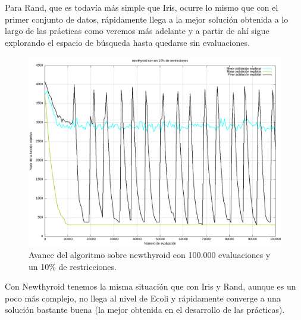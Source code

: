\documentclass[12pt, spanish]{article}
\begin{document}
Para Rand, que es todavía más simple que Iris, ocurre lo mismo que con el primer conjunto de datos, rápidamente llega a la mejor solución obtenida a lo largo de las prácticas como veremos más adelante y a partir de ahí sigue explorando el espacio de búsqueda hasta quedarse sin evaluaciones.

\begin{figure}[H]
	\centering
	\includegraphics[scale = 0.5]{newthyroid_1.png}
	
	\caption{Avance del algoritmo sobre newthyroid con 100.000 evaluaciones y un 10\% de restricciones.}
	\label{fig:new_1}
\end{figure}

Con Newthyroid tenemos la misma situación que con Iris y Rand, aunque es un poco más complejo, no llega al nivel de Ecoli y rápidamente converge a una solución bastante buena (la mejor obtenida en el desarrollo de las prácticas).

\newpage
\end{document}
